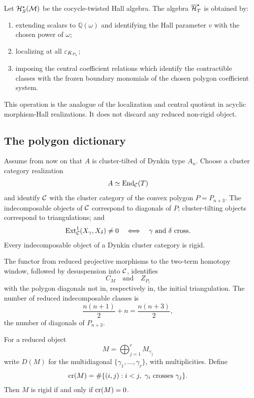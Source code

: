 \begin{definition}
\label{def:Hred}
Let $\mathcal H_S^\star(\mathcal M)$ be the cocycle-twisted Hall algebra.  The algebra
$\overline{\mathcal H}_{T}^{\star}$ is obtained by:
\begin{enumerate}[label=(\roman*),leftmargin=2.2em]
\item extending scalars to $\mathbb Q(\omega)$ and identifying the Hall
      parameter $v$ with the chosen power of $\omega$;
\item localizing at all $\varepsilon_{K_{P_i}}$;
\item imposing the central coefficient relations which identify the
      contractible classes with the frozen boundary monomials of the chosen
      polygon coefficient system.
\end{enumerate}
\end{definition}

This operation is the analogue of the localization and central quotient in
acyclic morphism-Hall realizations.  It does not discard any reduced
non-rigid object.

\subsection{The polygon dictionary}

Assume from now on that $A$ is cluster-tilted of Dynkin type $A_n$.  Choose a
cluster category realization
\[
 A\simeq\operatorname{End}_{\mathcal C}(T)
\]
and identify $\mathcal C$ with the cluster category of the convex polygon
$P=P_{n+3}$.  The indecomposable objects of $\mathcal C$ correspond to diagonals of
$P$; cluster-tilting objects correspond to triangulations; and
\[
 \operatorname{Ext}^1_{\mathcal C}(X_\gamma,X_\delta)\ne0
 \quad\Longleftrightarrow\quad
 \gamma\text{ and }\delta\text{ cross}.
\]
Every indecomposable object of a Dynkin cluster category is rigid.

The functor from reduced projective morphisms to the two-term homotopy window,
followed by desuspension into $\mathcal C$, identifies
\[
 C_M\quad\text{and}\quad Z_{P_i}
\]
with the polygon diagonals not in, respectively in, the initial triangulation.
The number of reduced indecomposable classes is
\[
 \frac{n(n+1)}2+n=\frac{n(n+3)}2,
\]
the number of diagonals of $P_{n+3}$.

For a reduced object
\[
 M=\bigoplus_{j=1}^r M_{\gamma_j}
\]
write $D(M)$ for the multidiagonal $\{\gamma_1,\ldots,\gamma_r\}$, with
multiplicities.  Define
\begin{equation}
 \operatorname{cr}(M)=
 \#\{(i,j):i<j,\ \gamma_i\text{ crosses }\gamma_j\}.
 \label{eq:crossing-number}
\end{equation}
Then $M$ is rigid if and only if $\operatorname{cr}(M)=0$.

